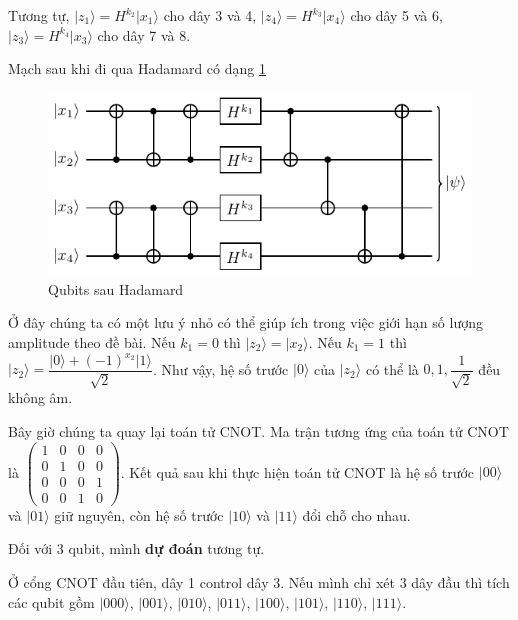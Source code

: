 Tương tự, $\lvert z_1 \rangle = H^{k_2} \lvert x_1 \rangle$ cho dây 3 và 4, $\lvert z_4 \rangle = H^{k_3} \lvert x_4 \rangle$ cho dây 5 và 6, $\lvert z_3 \rangle = H^{k_4} \lvert x_3 \rangle$ cho dây 7 và 8.

Mạch sau khi đi qua Hadamard có dạng \ref{nsucrypto23:p10_5}

\begin{figure}[ht]
    \centering
    \includegraphics[page=7]{nsucrypto/problem10_figures.pdf}
    \caption{Qubits sau Hadamard}
    \label{nsucrypto23:p10_5}
\end{figure}

Ở đây chúng ta có một lưu ý nhỏ có thể giúp ích trong việc giới hạn số lượng amplitude theo đề bài. Nếu $k_1 = 0$ thì $\lvert z_2 \rangle = \lvert x_2 \rangle$. Nếu $k_1 = 1$ thì $\lvert z_2 \rangle = \dfrac{\lvert 0 \rangle + (-1)^{x_2} \lvert 1 \rangle}{\sqrt{2}}$. Như vậy, hệ số trước $\lvert 0 \rangle$ của $\lvert z_2 \rangle$ có thể là $0, 1, \dfrac{1}{\sqrt{2}}$ đều không âm.

Bây giờ chúng ta quay lại toán tử CNOT. Ma trận tương ứng của toán tử CNOT là $\begin{pmatrix} 1 & 0 & 0 & 0 \\ 0 & 1 & 0 & 0 \\ 0 & 0 & 0 & 1 \\ 0 & 0 & 1 & 0 \end{pmatrix}$. Kết quả sau khi thực hiện toán tử CNOT là hệ số trước $\lvert 00 \rangle$ và $\lvert 01 \rangle$ giữ nguyên, còn hệ số trước $\lvert 10 \rangle$ và $\lvert 11 \rangle$ đổi chỗ cho nhau.

Đối với 3 qubit, mình \textbf{dự đoán} tương tự. 

Ở cổng CNOT đầu tiên, dây 1 control dây 3. Nếu mình chỉ xét 3 dây đầu thì tích các qubit gồm $\lvert 000 \rangle$, $\lvert 001 \rangle$, $\lvert 010 \rangle$, $\lvert 011 \rangle$, $\lvert 100 \rangle$, $\lvert 101 \rangle$, $\lvert 110 \rangle$, $\lvert 111 \rangle$. 

